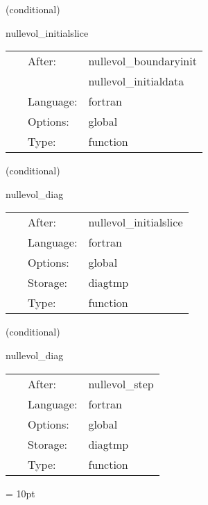 \vspace{5mm}

   (conditional) 

\hspace{5mm} nullevol\_initialslice 

\hspace{5mm}{\it construct null metric on the initial null hypersurface } 


\hspace{5mm}

 \begin{tabular*}{160mm}{cll} 
~ & After:  & nullevol\_boundaryinit \\ 
~& ~ &nullevol\_initialdata\\ 
~ & Language:  & fortran \\ 
~ & Options:  & global \\ 
~ & Type:  & function \\ 
\end{tabular*} 


\vspace{5mm}

   (conditional) 

\hspace{5mm} nullevol\_diag 

\hspace{5mm}{\it diagnostics of the characteristic code } 


\hspace{5mm}

 \begin{tabular*}{160mm}{cll} 
~ & After:  & nullevol\_initialslice \\ 
~ & Language:  & fortran \\ 
~ & Options:  & global \\ 
~ & Storage:  & diagtmp \\ 
~ & Type:  & function \\ 
\end{tabular*} 


\vspace{5mm}

   (conditional) 

\hspace{5mm} nullevol\_diag 

\hspace{5mm}{\it diagnostics of the characteristic code } 


\hspace{5mm}

 \begin{tabular*}{160mm}{cll} 
~ & After:  & nullevol\_step \\ 
~ & Language:  & fortran \\ 
~ & Options:  & global \\ 
~ & Storage:  & diagtmp \\ 
~ & Type:  & function \\ 
\end{tabular*} 



\vspace{5mm}\parskip = 10pt 

